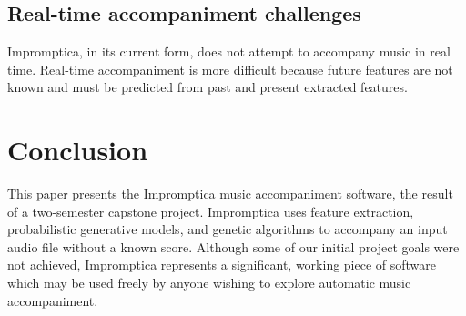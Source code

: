 \documentclass[11pt,conference,letterpaper]{IEEEtran}
\begin{document}
\subsection{Real-time accompaniment challenges}

Impromptica, in its current form, does not attempt to accompany music in real time. Real-time accompaniment is more difficult because future features are not known and must be predicted from past and present extracted features.

\section{Conclusion}

This paper presents the Impromptica music accompaniment software, the result of a two-semester capstone project. Impromptica uses feature extraction, probabilistic generative models, and genetic algorithms to accompany an input audio file without a known score. Although some of our initial project goals were not achieved, Impromptica represents a significant, working piece of software which may be used freely by anyone wishing to explore automatic music accompaniment.



\end{document}
